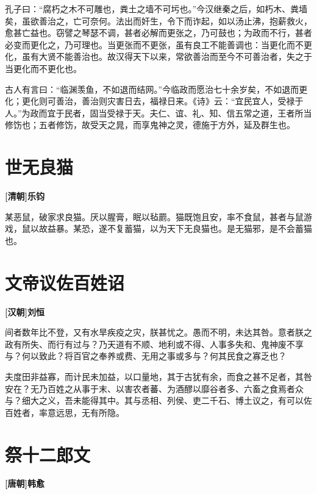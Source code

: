 \documentclass[UTF8,titlepage,oneside]{ctexbook}
\begin{document}
孔子曰：“腐朽之木不可雕也，粪土之墙不可圬也。”今汉继秦之后，如朽木、粪墙矣，虽欲善治之，亡可奈何。法出而奸生，令下而诈起，如以汤止沸，抱薪救火，愈甚亡益也。窃譬之琴瑟不调，甚者必解而更张之，乃可鼓也；为政而不行，甚者必变而更化之，乃可理也。当更张而不更张，虽有良工不能善调也：当更化而不更化，虽有大贤不能善治也。故汉得天下以来，常欲善治而至今不可善治者，失之于当更化而不更化也。

古人有言曰：“临渊羡鱼，不如退而结网。”今临政而愿治七十余岁矣，不如退而更化；更化则可善治，善治则灾害日去，福禄日来。《诗》云：“宜民宜人，受禄于人。”为政而宜于民者，固当受禄于天。夫仁、谊、礼、知、信五常之道，王者所当修饬也；五者修饬，故受天之晁，而享鬼神之灵，德施于方外，延及群生也。


\chapter*{世无良猫}
\begin{center}
	\textbf{[清朝]乐钧}
\end{center}

某恶鼠，破家求良猫。厌以腥膏，眠以毡罽。猫既饱且安，率不食鼠，甚者与鼠游戏，鼠以故益暴。某恐，遂不复蓄猫，以为天下无良猫也。是无猫邪，是不会蓄猫也。


\chapter*{文帝议佐百姓诏}
\begin{center}
	\textbf{[汉朝]刘恒}
\end{center}

间者数年比不登，又有水旱疾疫之灾，朕甚忧之。愚而不明，未达其咎。意者朕之政有所失、而行有过与？乃天道有不顺、地利或不得、人事多失和、鬼神废不享与？何以致此？将百官之奉养或费、无用之事或多与？何其民食之寡乏也？

夫度田非益寡，而计民未加益，以口量地，其于古犹有余，而食之甚不足者，其咎安在？无乃百姓之从事于末、以害农者蕃、为酒醪以靡谷者多、六畜之食焉者众与？细大之义，吾未能得其中。其与丞相、列侯、吏二千石、博土议之，有可以佐百姓者，率意远思，无有所隐。


\chapter*{祭十二郎文}
\begin{center}
	\textbf{[唐朝]韩愈}
\end{center}
\end{document}
